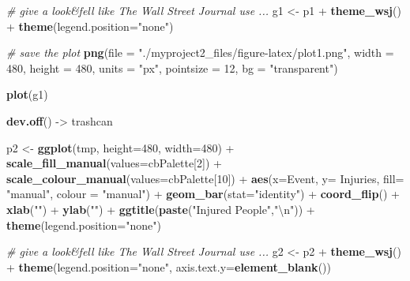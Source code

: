 \documentclass[12pt,spanish, american,b4paper, onecolumn, lmargin=1cm, rmargin=1cm, tmargin=1cm, bmargin=2cm,]{article}
\newenvironment{Shaded}{}{}
\newcommand{\KeywordTok}[1]{\textbf{{#1}}}
\newcommand{\DataTypeTok}[1]{\textcolor[rgb]{0.50,0.00,0.00}{{#1}}}
\newcommand{\DecValTok}[1]{\textcolor[rgb]{0.00,0.00,1.00}{{#1}}}
\newcommand{\CharTok}[1]{\textcolor[rgb]{1.00,0.00,1.00}{{#1}}}
\newcommand{\StringTok}[1]{\textcolor[rgb]{0.87,0.00,0.00}{{#1}}}
\newcommand{\CommentTok}[1]{\textcolor[rgb]{0.50,0.50,0.50}{\textit{{#1}}}}
\newcommand{\NormalTok}[1]{{#1}}
\begin{document}
\begin{Shaded}
\begin{Highlighting}[]
{{\CommentTok{# give a look&fell like The Wall Street Journal use ... }
\NormalTok{g1 <-}\StringTok{ }\NormalTok{p1 +}\StringTok{ }
\StringTok{  }\KeywordTok{theme_wsj}\NormalTok{() +}
\StringTok{  }\KeywordTok{theme}\NormalTok{(}\DataTypeTok{legend.position=}\StringTok{"none"}\NormalTok{)}

\CommentTok{# save the plot }
\KeywordTok{png}\NormalTok{(}\DataTypeTok{file =} \StringTok{"./myproject2_files/figure-latex/plot1.png"}\NormalTok{, }
    \DataTypeTok{width =} \DecValTok{480}\NormalTok{, }
    \DataTypeTok{height =} \DecValTok{480}\NormalTok{, }
    \DataTypeTok{units =} \StringTok{"px"}\NormalTok{, }
    \DataTypeTok{pointsize =} \DecValTok{12}\NormalTok{,}
    \DataTypeTok{bg =} \StringTok{"transparent"}\NormalTok{)}

\KeywordTok{plot}\NormalTok{(g1)}

\KeywordTok{dev.off}\NormalTok{() ->}\StringTok{ }\NormalTok{trashcan}

\NormalTok{p2 <-}\StringTok{ }\KeywordTok{ggplot}\NormalTok{(tmp, }\DataTypeTok{height=}\DecValTok{480}\NormalTok{, }\DataTypeTok{width=}\DecValTok{480}\NormalTok{) +}\StringTok{ }
\StringTok{  }\KeywordTok{scale_fill_manual}\NormalTok{(}\DataTypeTok{values=}\NormalTok{cbPalette[}\DecValTok{2}\NormalTok{]) +}
\StringTok{  }\KeywordTok{scale_colour_manual}\NormalTok{(}\DataTypeTok{values=}\NormalTok{cbPalette[}\DecValTok{10}\NormalTok{]) +}
\StringTok{  }\KeywordTok{aes}\NormalTok{(}\DataTypeTok{x=}\NormalTok{Event, }\DataTypeTok{y=} \NormalTok{Injuries, }\DataTypeTok{fill=} \StringTok{"manual"}\NormalTok{, }\DataTypeTok{colour =} \StringTok{"manual"}\NormalTok{) +}
\StringTok{  }\KeywordTok{geom_bar}\NormalTok{(}\DataTypeTok{stat=}\StringTok{"identity"}\NormalTok{) +}
\StringTok{  }\KeywordTok{coord_flip}\NormalTok{() +}\StringTok{ }
\StringTok{  }\KeywordTok{xlab}\NormalTok{(}\StringTok{""}\NormalTok{) +}\StringTok{ }
\StringTok{  }\KeywordTok{ylab}\NormalTok{(}\StringTok{""}\NormalTok{) +}\StringTok{ }
\StringTok{  }\KeywordTok{ggtitle}\NormalTok{(}\KeywordTok{paste}\NormalTok{(}\StringTok{"Injured People"}\NormalTok{,}\StringTok{"}\CharTok{\textbackslash{}n}\StringTok{"}\NormalTok{)) +}
\StringTok{  }\KeywordTok{theme}\NormalTok{(}\DataTypeTok{legend.position=}\StringTok{"none"}\NormalTok{)}

\CommentTok{# give a look&fell like The Wall Street Journal use ... }
\NormalTok{g2 <-}\StringTok{ }\NormalTok{p2 +}\StringTok{ }
\StringTok{  }\KeywordTok{theme_wsj}\NormalTok{() +}
\StringTok{  }\KeywordTok{theme}\NormalTok{(}\DataTypeTok{legend.position=}\StringTok{"none"}\NormalTok{, }\DataTypeTok{axis.text.y=}\KeywordTok{element_blank}\NormalTok{())}

}}
\end{Highlighting}
\end{Shaded}
\end{document}
